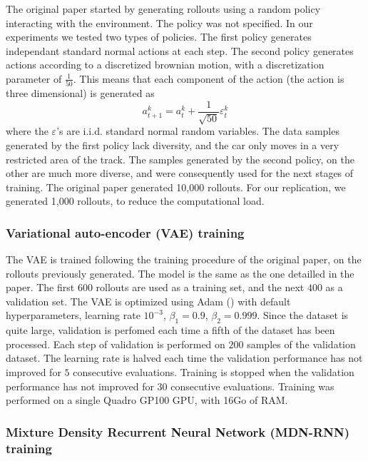 \documentclass[10pt,a4paper,onecolumn]{article}
\begin{document}
The original paper started by generating rollouts using a random policy
interacting with the environment. The policy was not specified. In our
experiments we tested two types of policies. The first policy generates
independant standard normal actions at each step. The second policy
generates actions according to a discretized brownian motion, with a
discretization parameter of \(\frac{1}{50}\). This means that each
component of the action (the action is three dimensional) is generated
as \[a^k_{t+1} = a^k_{t} + \frac{1}{\sqrt{50}} \varepsilon^k_t\] where
the \(\varepsilon\)'s are i.i.d. standard normal random variables. The
data samples generated by the first policy lack diversity, and the car
only moves in a very restricted area of the track. The samples generated
by the second policy, on the other are much more diverse, and were
consequently used for the next stages of training. The original paper
generated 10,000 rollouts. For our replication, we generated 1,000
rollouts, to reduce the computational load.

\hypertarget{variational-auto-encoder-vae-training}{%
\subsubsection{Variational auto-encoder (VAE)
training}\label{variational-auto-encoder-vae-training}}

The VAE is trained following the training procedure of the original
paper, on the rollouts previously generated. The model is the same as
the one detailled in the paper. The first \(600\) rollouts are used as a
training set, and the next \(400\) as a validation set. The VAE is
optimized using Adam (\textcite{adam}) with default hyperparameters,
learning rate \(10^{-3}\), \(\beta_1=0.9\), \(\beta_2=0.999\). Since the
dataset is quite large, validation is perfomed each time a fifth of the
dataset has been processed. Each step of validation is performed on
\(200\) samples of the validation dataset. The learning rate is halved
each time the validation performance has not improved for \(5\)
consecutive evaluations. Training is stopped when the validation
performance has not improved for \(30\) consecutive evaluations.
Training was performed on a single Quadro GP100 GPU, with 16Go of RAM.

\hypertarget{mixture-density-recurrent-neural-network-mdn-rnn-training}{%
\subsubsection{Mixture Density Recurrent Neural Network (MDN-RNN)
training}\label{mixture-density-recurrent-neural-network-mdn-rnn-training}}
\end{document}
